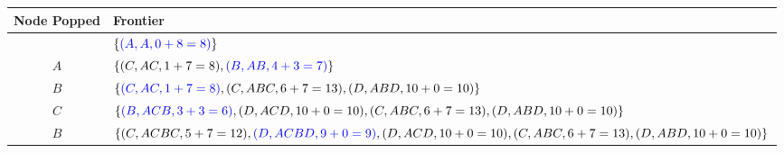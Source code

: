 \begin{table}[ht!]
    \centering
    \renewcommand{\arraystretch}{1.15}

    \begin{tabularx}{0.85\textwidth}{||c|Y||} %
        \hline
        Node Popped & Frontier                                                                                                     \\ \hline \hline
                    & $\{ {\color{blue}(A,A, 0+8=8)} \}$                                                                           \\ \hline
        $A$         & $\{ (C,AC, 1+7=8), {\color{blue}(B,AB, 4+3=7)} \}$                                                           \\ \hline
        $B$         & $\{ {\color{blue}(C,AC, 1+7=8)}, (C,ABC, 6+7=13), (D,ABD, 10+0=10) \}$                                       \\ \hline
        $C$         & $\{ {\color{blue}(B,ACB, 3+3=6)}, (D,ACD, 10+0=10), (C,ABC, 6+7=13), (D,ABD, 10+0=10) \}$                    \\ \hline
        $B$         & $\{ (C,ACBC, 5+7=12), {\color{blue}(D,ACBD, 9+0=9)}, (D,ACD, 10+0=10), (C,ABC, 6+7=13), (D,ABD, 10+0=10) \}$ \\ \hline
    \end{tabularx}
\end{table}

